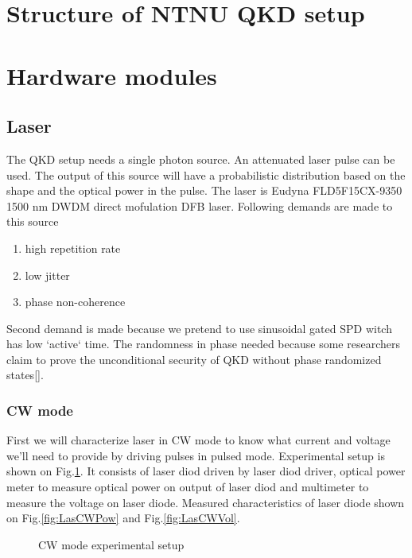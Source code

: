 \label{ch:Experiment and results}


\section{Structure of NTNU QKD setup}


\section{Hardware modules}



\subsection{Laser}


The QKD setup needs a single photon source. An attenuated laser pulse
can be used. The output of this source will have a probabilistic
distribution based on the shape and the optical power in the
pulse. The laser is Eudyna FLD5F15CX-9350 1500 nm DWDM direct
mofulation DFB laser.  Following demands are made to this source
\begin{enumerate}
\item high repetition rate
\item low jitter
\item phase non-coherence
\end{enumerate}
Second demand is made because we pretend to use sinusoidal gated SPD
witch has low `active` time.  The randomness in phase needed because
some researchers claim to prove the unconditional security of QKD without
phase randomized states[].


\subsubsection{CW mode}

First we will characterize laser in CW mode to know what current and
voltage we'll need to provide by driving pulses in pulsed
mode. Experimental setup is shown on Fig.\ref{fig:LasCWSetup}. It consists of
laser diod driven by laser diod driver, optical power meter to measure
optical power on output of laser diod and multimeter to measure the
voltage on laser diode. Measured characteristics of laser diode shown 
on Fig.\ref{fig:LasCWPow} and Fig.\ref{fig:LasCWVol}.

\begin{figure}[h]
  \centering
    \caption{CW mode experimental setup}
  \label{fig:LasCWSetup}
\end{figure}


